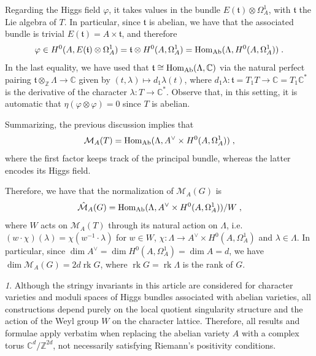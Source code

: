 \documentclass[11pt,english]{amsart}
\numberwithin{equation}{section}
\numberwithin{figure}{section}
\theoremstyle{plain}
\theoremstyle{plain}
\theoremstyle{definition}
\theoremstyle{remark}
\newtheorem{rem}[thm]{\protect\remarkname}
\newcommand{\ZZ}{\mathbb{Z}}
\newcommand{\CC}{\mathbb{C}}
\newcommand{\Hom}{\operatorname{Hom}}
\newcommand{\rk}{\operatorname{rk}}
\newcommand{\Ab}{\textup{Ab}}
\providecommand{\remarkname}{Remark}
\begin{document}
Regarding the Higgs field $\varphi$, it takes values in the bundle $E(\mathfrak{t}) \otimes \Omega^1_A$, with $\mathfrak{t}$ the Lie algebra of $T$. In particular, since $\mathfrak{t}$ is abelian, we have that the associated bundle is trivial $E(\mathfrak{t}) = A \times \mathfrak{t}$, and therefore
$$
    \varphi \in H^0(A, E(\mathfrak{t}) \otimes \Omega^1_A) = \mathfrak{t} \otimes H^0(A, \Omega^1_A) = \Hom_{\Ab}(\Lambda, H^0(A, \Omega^1_A))\; .
$$
In the last equality, we have used that $\mathfrak{t} \cong \Hom_\Ab(\Lambda, \CC)$ via the natural perfect pairing $\mathfrak{t} \otimes_{\ZZ} \Lambda \to \CC$ given by $(t, \lambda) \mapsto d_1\lambda(t)$, where $d_1\lambda: \mathfrak{t} = T_1T \to \CC = T_1 \mathbb{C}^*$ is the derivative of the character $\lambda: T \to \mathbb{C}^*$. Observe that, in this setting, it is automatic that $\eta(\varphi \otimes \varphi) = 0$ since $T$ is abelian.

Summarizing, the previous discussion implies that
$$
    \mathcal{M}_A(T) = \Hom_{\Ab}(\Lambda, A^\vee \times H^0(A, \Omega^1_A))\; ,
$$
where the first factor keeps track of the principal bundle, whereas the latter encodes its Higgs field.

Therefore, we have that the normalization of $\mathcal{M}_A(G)$ is
\begin{equation}\label{eq:Higgs}
    \hat{\mathcal{M}}_A(G) = \Hom_{\Ab}(\Lambda, A^\vee \times H^0(A, \Omega^1_A)) / W\; ,
\end{equation}
where $W$ acts on $\mathcal{M}_A(T)$ through its natural action on $\Lambda$, i.e. $(w \cdot \chi)(\lambda) = \chi(w^{-1} \cdot \lambda)$ for $w \in W$, $\chi: \Lambda \to A^\vee \times  H^0(A, \Omega^1_A)$ and $\lambda \in \Lambda$. In particular, since $\dim A^\vee = \dim H^0(A, \Omega^1_A) = \dim A = d$, we have $\dim \mathcal{M}_A(G) = 2d\rk G$, where $\rk G = \rk \Lambda$ is the rank of $G$.

\begin{rem}
Although the stringy invariants in this article are considered for character varieties and moduli spaces of Higgs bundles associated with abelian varieties, all constructions depend purely on the local quotient singularity structure and the action of the Weyl group $W$ on the character lattice. Therefore, all results and formulae apply verbatim when replacing the abelian variety $A$ with a complex torus $\mathbb{C}^d/\mathbb{Z}^{2d}$, not  necessarily satisfying Riemann's positivity conditions.
\end{rem}
\end{document}
